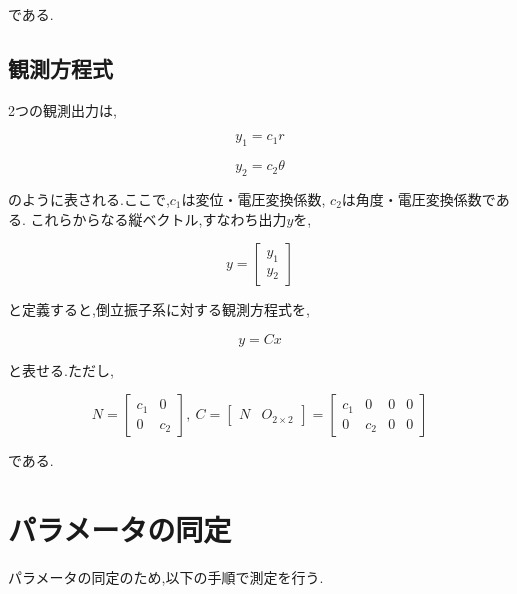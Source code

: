\documentclass[a4j,11pt,twoside]{jbook}
\begin{document}
である.

\subsection{観測方程式}
2つの観測出力は,

$$
    y_{1} = c_{1} r
$$

$$
    y_{2} = c_{2} \theta
$$

のように表される.ここで,$c_{1}$は変位・電圧変換係数, $c_{2}$は角度・電圧変換係数である.
これらからなる縦ベクトル,すなわち出力$y$を,

$$
    y = 
    \left[
        \begin{array}{c}
            y_{1} \\
            y_{2}
        \end{array}    
    \right]
$$

と定義すると,倒立振子系に対する観測方程式を,

\begin{equation}
    y = Cx
\end{equation}

と表せる.ただし,

$$
    N = 
    \left[
        \begin{array}{cc}
            c_{1}  &  0 \\
            0      &  c_{2}
        \end{array}
    \right],\
    C = 
    \left[
        \begin{array}{cc}
            N  &  O_{2 \times 2}
        \end{array}
    \right]
    =
    \left[
        \begin{array}{cccc}
            c_{1}  &    0    &    0    &    0 \\
            0      &  c_{2}  &    0    &    0
        \end{array}
    \right]
$$

である.

\section{パラメータの同定}
パラメータの同定のため,以下の手順で測定を行う.
\end{document}
